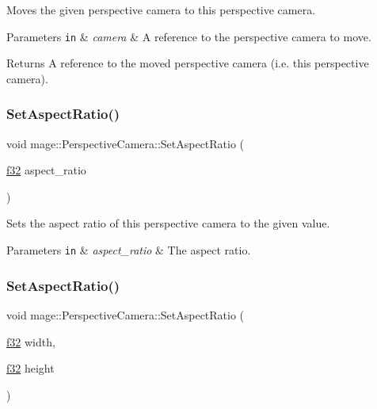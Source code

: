 Moves the given perspective camera to this perspective camera.


\begin{DoxyParams}[1]{Parameters}
\mbox{\tt in}  & {\em camera} & A reference to the perspective camera to move. \\
\hline
\end{DoxyParams}
\begin{DoxyReturn}{Returns}
A reference to the moved perspective camera (i.\+e. this perspective camera). 
\end{DoxyReturn}
\hypertarget{classmage_1_1_perspective_camera_a5dafb5a3583c500f37d6c9fbae912511}{}\label{classmage_1_1_perspective_camera_a5dafb5a3583c500f37d6c9fbae912511} 
\subsubsection{\texorpdfstring{Set\+Aspect\+Ratio()}{SetAspectRatio()}\hspace{0.1cm}{\footnotesize\ttfamily [1/2]}}
{\footnotesize\ttfamily void mage\+::\+Perspective\+Camera\+::\+Set\+Aspect\+Ratio (\begin{DoxyParamCaption}\item[{\hyperlink{namespacemage_a6a44ad388483959dc4dff9f2aef91431}{f32}}]{aspect\+\_\+ratio }\end{DoxyParamCaption})\hspace{0.3cm}{\ttfamily [noexcept]}}

Sets the aspect ratio of this perspective camera to the given value.


\begin{DoxyParams}[1]{Parameters}
\mbox{\tt in}  & {\em aspect\+\_\+ratio} & The aspect ratio. \\
\hline
\end{DoxyParams}
\hypertarget{classmage_1_1_perspective_camera_a3066d8e949d3bbd5999ec16553a34f01}{}\label{classmage_1_1_perspective_camera_a3066d8e949d3bbd5999ec16553a34f01} 
\subsubsection{\texorpdfstring{Set\+Aspect\+Ratio()}{SetAspectRatio()}\hspace{0.1cm}{\footnotesize\ttfamily [2/2]}}
{\footnotesize\ttfamily void mage\+::\+Perspective\+Camera\+::\+Set\+Aspect\+Ratio (\begin{DoxyParamCaption}\item[{\hyperlink{namespacemage_a6a44ad388483959dc4dff9f2aef91431}{f32}}]{width,  }\item[{\hyperlink{namespacemage_a6a44ad388483959dc4dff9f2aef91431}{f32}}]{height }\end{DoxyParamCaption})\hspace{0.3cm}{\ttfamily [noexcept]}}

